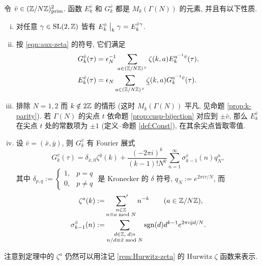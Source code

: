 \begin{theorem}\label{prop:Eisenstein-congruence-subgrp}
	令 $\bar{v} \in (\mathbb{Z}/N\mathbb{Z})^2_{\mathrm{prim}}$. 函数 $E^{\bar{v}}_k$ 和 $G^{\bar{v}}_k$ 都是 $M_k(\Gamma(N))$ 的元素, 并且有以下性质.
	\begin{enumerate}[(i)]
		\item 对任意 $\gamma \in \operatorname{SL}(2,\mathbb{Z})$ 皆有 $E^{\bar{v}}_k \;\big|_{k} \; \gamma = E^{\bar{v}\gamma}_k$.
		\item 按 \eqref{eqn:aux-zeta} 的符号, 它们满足
		\begin{align*}
			G^{\bar{v}}_k(\tau) & = \epsilon_N^{-1} \sum_{a \in (\mathbb{Z}/N\mathbb{Z})^\times} \zeta(k,a) E^{a^{-1}\bar{v}}_k(\tau), \\
			E^{\bar{v}}_k(\tau) & = \epsilon_N \sum_{a \in (\mathbb{Z}/N\mathbb{Z})^\times} \underline{\zeta}(k,a) G^{a^{-1}\bar{v}}_k(\tau).
		\end{align*}
		\item 排除 $N = 1, 2$ 而 $k \notin 2\mathbb{Z}$ 的情形 (这时 $M_k(\Gamma(N))$ 平凡, 见命题 \ref{prop:k-parity}). 若 $\Gamma(N)$ 的尖点 $t$ 依命题 \ref{prop:cusp-bijection} 对应到 $\pm\bar{v}$, 那么 $E^{\bar{v}}_k$ 在尖点 $t$ 处的常数项为 $\pm 1$ (定义--命题 \ref{def:Const}), 在其余尖点皆取零值.
		\item 设 $\bar{v}=(\bar{x},\bar{y})$, 则 $G^{\bar{v}}_k$ 有 Fourier 展式
		\[ G^{\bar{v}}_k(\tau) = \delta_{\bar{x},0} \zeta^{\bar{y}}(k) + \frac{(-2\pi i)^k}{(k-1)! N^k} \sum_{n=1}^\infty \sigma^{\bar{v}}_{k-1}(n) q_N^n, \]
		其中 $\delta_{p,q} := \begin{cases} 1, & p=q \\ 0, & p \neq q \end{cases}$ 是 Kronecker 的 $\delta$ 符号, $q_N := e^{2\pi i\tau/N}$, 而
		\begin{align*}
			\zeta^a(k) & := \sideset{}{'}\sum_{\substack{n \in \mathbb{Z} \\ n \equiv a \bmod N}} n^{-k} \qquad (a \in \mathbb{Z}/N\mathbb{Z}), \\
			\sigma^{\bar{v}}_{k-1}(n) & := \sum_{\substack{d \in \mathbb{Z}, \; d \mid n \\ n/d \equiv \bar{x} \bmod N }} \operatorname{sgn}(d) d^{k-1} e^{2\pi i \bar{y} d /N}.
		\end{align*}
	\end{enumerate}
\end{theorem}

注意到定理中的 $\zeta^a$ 仍然可以用注记 \ref{rem:Hurwitz-zeta} 的 Hurwitz $\zeta$ 函数来表示. 


